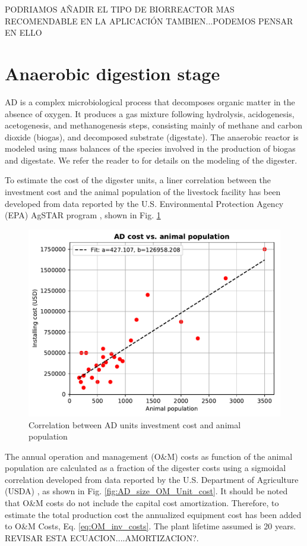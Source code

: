 \documentclass[10pt,a4paper]{article}
\begin{document}
PODRIAMOS AÑADIR EL TIPO DE BIORREACTOR MAS RECOMENDABLE EN LA APLICACIÓN TAMBIEN...PODEMOS PENSAR EN ELLO

\section{Anaerobic digestion stage}
AD is a complex microbiological process that decomposes organic matter in the absence of oxygen. It produces a gas mixture following hydrolysis, acidogenesis, acetogenesis, and methanogenesis steps, consisting mainly of methane and carbon dioxide (biogas), and decomposed substrate (digestate). The anaerobic reactor is modeled using mass balances of the species involved in the production of biogas and digestate. We refer the reader to \cite{Leon} for details on the modeling of the digester.

To estimate the cost of the digester units, a liner correlation between the investment cost and the animal population of the livestock facility has been developed from data reported by the U.S. Environmental Protection Agency (EPA) AgSTAR program \cite{AgSTAR2003}, shown in Fig. \ref{fig:AD_size_cost}
\begin{figure}[H]
	\centering
	\includegraphics[width=0.6\linewidth]{AD_size_cost} 
	\caption{Correlation between AD units investment cost and animal population}
	\label{fig:AD_size_cost}
\end{figure}

The annual operation and management (O\&M) costs as function of the animal population are calculated as a fraction of the digester costs using a sigmoidal correlation developed from data reported by the U.S. Department of Agriculture (USDA) \cite{USDA_OM}, as shown in Fig. \ref{fig:AD_size_OM_Unit_cost}. It should be noted that O\&M costs do not include the capital cost amortization. Therefore, to estimate the total production cost the annualized equipment cost has been added to O\&M Costs, Eq.  \ref{eq:OM_inv_costs}. The plant lifetime assumed is 20 years. REVISAR ESTA ECUACION....AMORTIZACION?.
\end{document}
